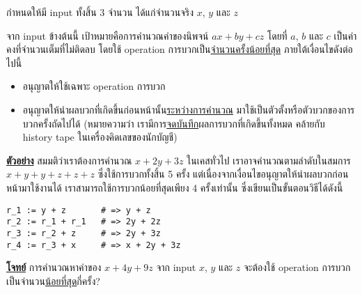 \question{}

กำหนดให้มี input ทั้งสิ้น 3 จำนวน ได้แก่จำนวนจริง $x$, $y$ และ $z$

จาก input ข้างต้นนี้ เป้าหมายคือการคำนวณค่าของนิพจน์ $ax + by + cz$
โดยที่ $a$, $b$ และ $c$ เป็นค่าคงที่จำนวนเต็มที่ไม่ติดลบ 
โดยใช้ operation การบวกเป็น\uline{จำนวนครั้งน้อยที่สุด}\;
ภายใต้เงื่อนไขดังต่อไปนี้

\begin{itemize}
    \item อนุญาตให้ใช้เฉพาะ operation การบวก
    \item อนุญาตให้นำผลบวกที่เกิดขึ้นก่อนหน้านั้น\uline{ระหว่างการคำนวณ}
        มาใช้เป็นตัวตั้งหรือตัวบวกของการบวกครั้งถัดไปได้\hrsp%
        (หมายความว่า เรามีการ\uline{จดบันทึก}ผลการบวกที่เกิดขึ้นทั้งหมด 
        คล้ายกับ history tape ในเครื่องคิดเลขของนักบัญชี)
\end{itemize}

\noindent
\textbf{\uline{ตัวอย่าง}} สมมติว่าเราต้องการคำนวณ $x + \mathrm{2}y + \mathrm{3}z$ ในเคสทั่วไป
เราอาจคำนวณตามลำดับในสมการ $x + y + y + z + z + z$ ซึ่งใช้การบวกทั้งสิ้น 5 ครั้ง\; 
แต่เนื่องจากเงื่อนไขอนุญาตให้นำผลบวกก่อนหน้ามาใช้งานได้ เราสามารถใช้การบวกน้อยที่สุดเพียง 4 ครั้งเท่านั้น
ซึ่งเขียนเป็นขั้นตอนวิธีได้ดังนี้
\begin{lstlisting}
r_1 := y + z       # => y + z
r_2 := r_1 + r_1   # => 2y + 2z
r_3 := r_2 + z     # => 2y + 3z
r_4 := r_3 + x     # => x + 2y + 3z
\end{lstlisting}

\noindent
\textbf{\uline{โจทย์}} การคำนวณหาค่าของ $x + \mathrm{4}y + \mathrm{9}z$ จาก input $x$, $y$ และ $z$ 
จะต้องใช้ operation การบวกเป็นจำนวน\uline{น้อยที่สุด}กี่ครั้ง?
